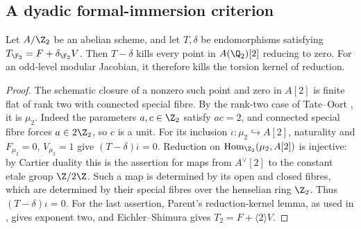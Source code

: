 \subsection{A dyadic formal-immersion criterion}
\begin{lemma}\label{lem:dyadic-Hecke}
Let $A/\Z_2$ be an abelian scheme, and let $T,\delta$ be
endomorphisms satisfying $T_{\F_2}=F+\delta_{\F_2}V$.
Then $T-\delta$ kills every point in $A(\Q_2)[2]$ reducing to zero.
For an odd-level modular Jacobian, it therefore kills the torsion
kernel of reduction.
\end{lemma}
\begin{proof}
The schematic closure of a nonzero such point and zero in $A[2]$
is finite flat of rank two with connected special fibre. By the
rank-two case of Tate--Oort \cite{TO}, it is $\mu_2$.
Indeed the parameters $a,c\in\Z_2$ satisfy $ac=2$, and connected
special fibre forces $a\in2\Z_2$, so $c$ is a unit.
For its inclusion $\iota:\mu_2\hookrightarrow A[2]$, naturality
and $F_{\mu_2}=0$, $V_{\mu_2}=1$ give
$(T-\delta)\overline\iota=0$.
Reduction on $\operatorname{Hom}_{\Z_2}(\mu_2,A[2])$ is injective:
by Cartier duality this is the assertion for maps from $A^\vee[2]$
to the constant etale group $\Z/2\Z$. Such a map is determined by
its open and closed fibres, which are determined by their special
fibres over the henselian ring $\Z_2$.
Thus $(T-\delta)\iota=0$.
For the last assertion, Parent's reduction-kernel lemma, as used
in \cite[Section~5]{DN}, gives exponent two, and Eichler--Shimura
gives $T_2=F+\langle2\rangle V$.
\end{proof}

